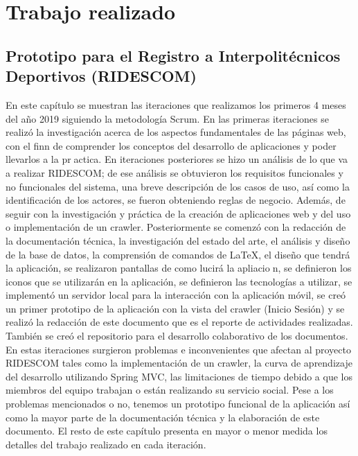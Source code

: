 \chapter{Trabajo realizado}
	
	
	\section{Prototipo para el Registro a Interpolit\'ecnicos Deportivos (RIDESCOM)}
	
	\noindent En este capítulo se muestran las iteraciones que realizamos los primeros 4 meses del año 2019 siguiendo la metodología Scrum. En las primeras iteraciones se realizó la investigación acerca de los aspectos fundamentales de las páginas web, con el finn de comprender los conceptos del desarrollo de aplicaciones y poder llevarlos a la practica. En iteraciones posteriores se hizo un análisis de lo que va a realizar RIDESCOM; de ese análisis se obtuvieron los requisitos funcionales y no funcionales del sistema, una breve descripción de los casos de uso, así como la identificación de los actores, se fueron obteniendo reglas de negocio. Además, de seguir con la investigación y práctica de la creación de aplicaciones web y del uso o implementación de un crawler. Posteriormente se comenzó con la redacción de la documentación técnica, la investigación del estado del arte, el análisis y diseño de la base de datos, la comprensión de comandos de LaTeX, el diseño que tendrá la aplicación, se realizaron pantallas de como lucirá la apliacion, se definieron los iconos que se utilizarán en la aplicación, se definieron las tecnologías a utilizar, se implementó un servidor local para la interacción con la aplicación móvil, se creó un primer prototipo de la aplicación con la vista del crawler (Inicio Sesión) y se realizó la redacción de este documento que es el reporte de actividades realizadas. También se creó el repositorio para el desarrollo colaborativo de los documentos. En estas iteraciones surgieron problemas e inconvenientes que afectan al proyecto RIDESCOM tales como la implementación de un crawler, la curva de aprendizaje del desarrollo utilizando Spring MVC, las limitaciones de tiempo debido a que los miembros del equipo trabajan o están realizando su servicio social. Pese a los problemas mencionados o no, tenemos un prototipo funcional de la aplicación así como la mayor parte de la documentación técnica y la elaboración de este documento. El resto de este capítulo presenta en mayor o menor medida los detalles del trabajo realizado en cada iteración.
	
